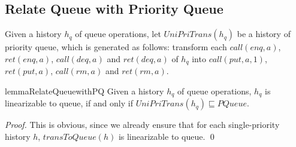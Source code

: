 \subsection{Relate Queue with Priority Queue}
\label{subsec:relate queue with priority queue}

Given a history $h_q$ of queue operations, let $\textit{UniPriTrans}(h_q)$ be a history of priority queue, which is generated as follows: transform each $\textit{call}(\textit{enq},a)$, $\textit{ret}(\textit{enq},a)$, $\textit{call}(\textit{deq},a)$ and $\textit{ret}(\textit{deq},a)$ of $h_q$ into $\textit{call}(\textit{put},a,1)$, $\textit{ret}(\textit{put},a)$, $\textit{call}(\textit{rm},a)$ and $\textit{ret}(\textit{rm},a)$.

\begin{restatable}{lemma}{RelateQueuewithPQ}
\label{lemma:relate queue with priority queue}
Given a history $h_q$ of queue operations, $h_q$ is linearizable to queue, if and only if $\textit{UniPriTrans}(h_q) \sqsubseteq \textit{PQueue}$.
\end{restatable}

\begin {proof}

This is obvious, since we already ensure that for each single-priority history $h$, $\textit{transToQueue}(h)$ is linearizable to queue. \qed
\end {proof}


